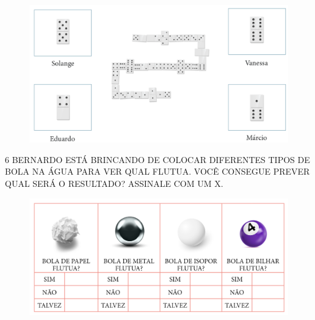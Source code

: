 
\begin{figure}[H]
\includegraphics[width=\textwidth]{./media/SAEB_1ANO_MAT_FIGURA89.png}
\end{figure}


\num{6} BERNARDO ESTÁ BRINCANDO DE COLOCAR DIFERENTES TIPOS DE BOLA NA ÁGUA
PARA VER QUAL FLUTUA. VOCÊ CONSEGUE PREVER QUAL SERÁ O RESULTADO? ASSINALE
COM UM X.


\begin{figure}[H]
\includegraphics[width=\textwidth]{./media/SAEB_1ANO_MAT_FIGURA90.png}
\end{figure}


